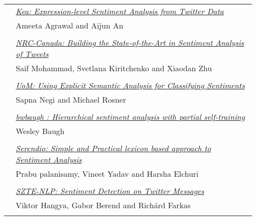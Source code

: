 \begin{tabular}{p{20mm}p{138mm}}
 & \hyperlink{page.530}{\em Kea: Expression-level Sentiment Analysis from Twitter Data}\\
         & Ameeta Agrawal and Aijun An \\
\\


& \hyperlink{page.321}{\em NRC-Canada: Building the State-of-the-Art in Sentiment Analysis of Tweets}\\
         & Saif Mohammad, Svetlana Kiritchenko and Xiaodan Zhu \\
\\


 & \hyperlink{page.535}{\em UoM: Using Explicit Semantic Analysis for Classifying Sentiments}\\
         & Sapna Negi and Michael Rosner \\
\\

 & \hyperlink{page.539}{\em bwbaugh : Hierarchical sentiment analysis with partial self-training}\\
         & Wesley Baugh \\
\\

 & \hyperlink{page.543}{\em Serendio: Simple and Practical lexicon based approach to Sentiment Analysis}\\
         & Prabu palanisamy, Vineet Yadav and Harsha Elchuri \\
\\

 & \hyperlink{page.549}{\em SZTE-NLP: Sentiment Detection on Twitter Messages}\\
         & Viktor Hangya, Gabor Berend and Rich\'{a}rd Farkas \\
\\


\end{tabular}
\newpage
